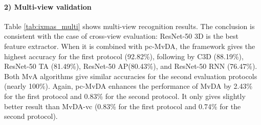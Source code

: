     \paragraph{2) Multi-view validation} Table \ref{tab:ixmas_multi} shows multi-view recognition results. The conclusion is consistent with the case of cross-view evaluation: ResNet-50 3D is the best feature extractor. When it is combined with pc-MvDA, the framework gives the highest accuracy for the first protocol (92.82\%), following by C3D (88.19\%), ResNet-50 TA (81.49\%), ResNet-50 AP(80.43\%), and ResNet-50 RNN (76.47\%). Both MvA algorithms give similar accuracies for the second evaluation protocols (nearly 100\%). Again, pc-MvDA enhances the performance of MvDA by 2.43\% for the first protocol and 0.83\% for the second protocol. It only gives slightly better result than MvDA-vc (0.83\% for the first protocol and 0.74\% for the second protocol). 

    \begin{table}[htbp]
    \centering
    \caption{Multi-view recognition comparison on IXMAS dataset.}
    \label{tab:ixmas_multi}
    \end{table}

